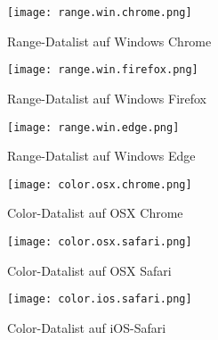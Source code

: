 \begin{figure}[!htb]
    \centering
    \begin{minipage}[b]{0.28\textwidth}
        \centering
        \texttt{[image: range.win.chrome.png]}
        \caption{\centering Range-Datalist auf Windows Chrome}
        \label{img:rangeWinChromeDatalist}
    \end{minipage}
    \hfill
    \begin{minipage}[b]{0.28\textwidth}
        \centering
        \texttt{[image: range.win.firefox.png]}
        \caption{\centering Range-Datalist auf Windows Firefox}
        \label{img:rangeWinFirefoxDatalist}
    \end{minipage}
    \hfill
    \begin{minipage}[b]{0.28\textwidth}
        \centering
        \texttt{[image: range.win.edge.png]}
        \caption{\centering Range-Datalist auf Windows Edge}
        \label{img:rangeWinEdgeDatalist}
    \end{minipage}
\end{figure}


\begin{figure}[!htb]
    \centering
    \begin{minipage}[b]{0.28\textwidth}
        \centering
        \texttt{[image: color.osx.chrome.png]}
        \caption{\centering Color-Datalist auf OSX Chrome}
        \label{img:colorOsxChromeDatalist}
    \end{minipage}
    \hfill
    \begin{minipage}[b]{0.28\textwidth}
        \centering
        \texttt{[image: color.osx.safari.png]}
        \caption{\centering Color-Datalist auf OSX Safari}
        \label{img:colorOsxSafariDatalist}
    \end{minipage}
    \hfill
    \begin{minipage}[b]{0.28\textwidth}
        \centering
        \texttt{[image: color.ios.safari.png]}
        \caption{\centering Color-Datalist auf iOS-Safari}
        \label{img:colorIsoSafariDatalist}
    \end{minipage}
\end{figure}

